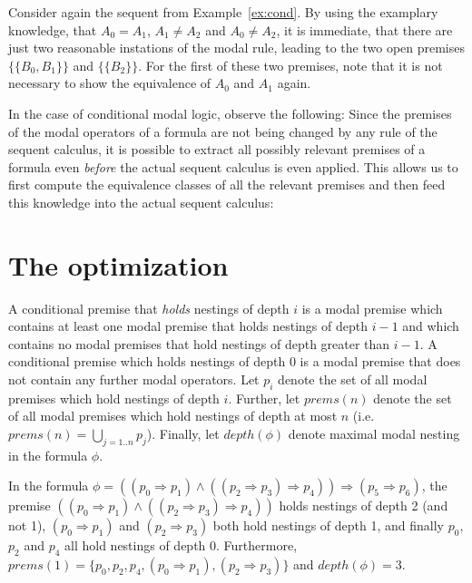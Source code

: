 \documentclass{entcs} \usepackage{entcsmacro}
\begin{document}
\begin{example}
Consider again the sequent from Example~\ref{ex:cond}. By using the examplary
knowledge, that $A_0=A_1$, $A_1\neq A_2$ and $A_0\neq A_2$, it is immediate,
that there are just two reasonable instations of the modal rule, leading
to the two open premises $\{\{B_0,B_1\}\}$ and $\{\{B_2\}\}$. For the
first of these two premises, note that it is not necessary to show the
equivalence of $A_0$ and $A_1$ again.
\end{example}


\begin{note}
In the case of conditional modal logic, observe the following: Since the
premises of the modal operators of a formula are not being changed by any
rule of the sequent calculus, it is possible to extract all possibly
relevant premises of a formula even \emph{before} the actual sequent
calculus is even applied. This allows us to first compute the equivalence
classes of all the relevant premises and then feed this knowledge into
the actual sequent calculus:
\end{note}

\section{The optimization}

\begin{definition}
A conditional premise that \emph{holds} nestings of depth $i$ is a
modal premise which contains at least one modal premise that holds
nestings of depth $i-1$ and which contains no modal premises that
hold nestings of depth greater than $i-1$. A
conditional premise which holds nestings of depth 0 is a modal
premise that does not contain any further modal operators.
Let $p_i$ denote the set of all modal premises which hold nestings
of depth $i$. Further, let $prems(n)$ denote the set of all modal
premises which hold nestings of depth at most $n$ (i.e.
$prems(n)=\bigcup_{j=1..n}^{} p_j$). Finally, let $depth(\phi)$ denote maximal
modal nesting in the formula $\phi$.
\end{definition}

\begin{example}
In the formula $\phi=((p_0\Rightarrow p_1) \wedge ((p_2\Rightarrow p_3)\Rightarrow p_4))
\Rightarrow (p_5\Rightarrow p_6)$,
the premise $((p_0\Rightarrow p_1) \wedge ((p_2\Rightarrow p_3)\Rightarrow p_4))$ holds
nestings of depth 2 (and not 1), $(p_0\Rightarrow p_1)$ and $(p_2\Rightarrow p_3)$ both
hold nestings of depth 1, and finally $p_0$, $p_2$ and $p_4$ all hold nestings of depth 0.
Furthermore, $prems(1)=\{p_0,p_2,p_4,(p_0\Rightarrow p_1),(p_2\Rightarrow p_3)\}$
and $depth(\phi)=3$.
\end{example}
\end{document}
